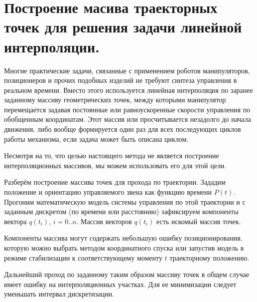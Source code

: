 \section{Построение масива траекторных точек для решения задачи линейной интерполяции.}

Многие практические задачи, связанные с применением роботов манипуляторов, позиционеров и прочих подобных изделий не требуют синтеза управления в реальном времени. Вместо этого используется линейная интерполяция по заранее заданному массиву геометрических точек, между которыми манипулятор перемещается задавая постоянные или равноускоренные скорости управления по обобщенным координатам. Этот массив или просчитывается незадолго до начала движения, либо вообще формируется один раз для всех последующих циклов работы механизма, если задача может быть описана циклом.

Несмотря на то, что целью настоящего метода не является построение интерполяционных массивов, мы можем использовать его для этой цели.

Разберём построение массива точек для прохода по траектории. Зададим положение и ориентацию управляемого звена как функцию времени $P(t)$. Прогоним математическую модель системы управления по этой траектории и с заданным дискретом (по времени или расстоянию) зафиксируем компоненты вектора $q(t_i)$, $i=0..n$. Массив векторов $q(t_i)$ есть искомый массив точек.

Компоненты массива могут содержать небольшую ошибку позиционирования, которую можно выбрать методом координатного спуска или запустив модель в режиме стабилизации к соответствующему моменту $t$ траекторному положению.

Дальнейший проход по заданному таким образом массиву точек в общем случае имеет ошибку на интерполяционных участках. Для ее минимизации следует уменьшать интервал дискретизации.